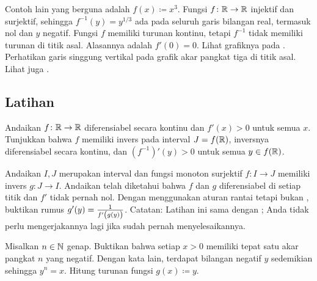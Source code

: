 \begin{example}
Contoh lain yang berguna adalah $f(x) \coloneqq x^3$.  Fungsi $f \colon {\mathbb{R}} \to {\mathbb{R}}$
injektif dan surjektif, sehingga $f^{-1}(y) = y^{1/3}$ ada pada seluruh garis
bilangan real, termasuk nol dan $y$ negatif.  Fungsi $f$ memiliki
turunan kontinu, tetapi $f^{-1}$ tidak memiliki turunan di titik asal.  Alasannya
adalah $f'(0) = 0$.  Lihat grafiknya pada .
Perhatikan garis singgung vertikal pada grafik akar pangkat tiga di titik asal.
Lihat juga .
\begin{myfigureht}
\caption{Grafik $x^3$ dan $x^{1/3}$.\label{cubecuberootfig}}
\end{myfigureht}
\end{example}


\subsection{Latihan}

\begin{exercise}
Andaikan $f \colon {\mathbb{R}} \to {\mathbb{R}}$ diferensiabel secara kontinu dan
$f'(x) > 0$ untuk semua $x$.  Tunjukkan bahwa $f$ memiliki invers pada interval $J =
f({\mathbb{R}})$, inversnya diferensiabel secara kontinu, dan ${(f^{-1})}'(y) >
0$ untuk semua $y \in f({\mathbb{R}})$.
\end{exercise}

\begin{exercise}
\pagebreak[2]
Andaikan $I,J$ merupakan interval dan fungsi monoton surjektif $f \colon I \to J$ memiliki invers $g \colon J \to I$.
Andaikan telah diketahui bahwa $f$ dan $g$ diferensiabel
di setiap titik dan $f'$ tidak pernah nol.  Dengan menggunakan aturan rantai tetapi bukan
, buktikan rumus
$g'(y) = \frac{1}{f'\left(\vphantom{1_1^1}g(y)\right)}$. %
Catatan: Latihan ini sama dengan ;
Anda tidak perlu mengerjakannya lagi jika
sudah pernah menyelesaikannya.
\end{exercise}

\begin{exercise}
\pagebreak[2]
Misalkan $n\in {\mathbb{N}}$ genap.
Buktikan bahwa setiap $x > 0$ memiliki tepat satu akar pangkat $n$ yang negatif.
Dengan kata lain, terdapat bilangan negatif $y$ sedemikian sehingga $y^n = x$.
Hitung turunan
fungsi $g(x) \coloneqq y$.
\end{exercise}

